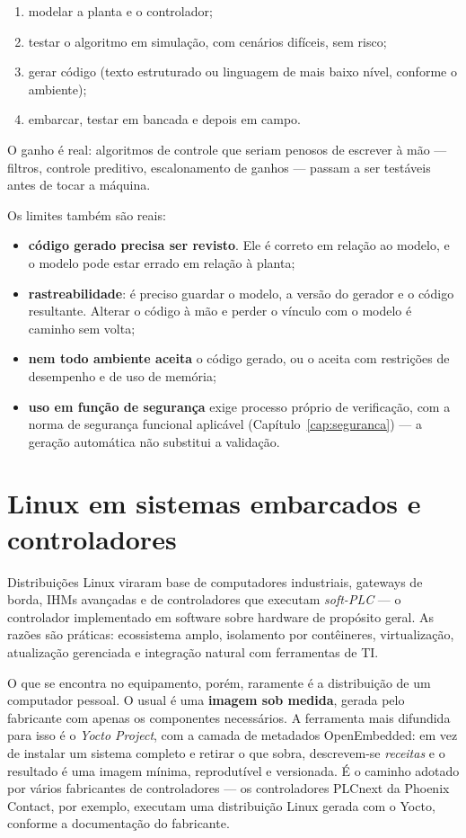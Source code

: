 \begin{enumerate}
  \item modelar a planta e o controlador;
  \item testar o algoritmo em simulação, com cenários difíceis, sem risco;
  \item gerar código (texto estruturado ou linguagem de mais baixo nível, conforme o ambiente);
  \item embarcar, testar em bancada e depois em campo.
\end{enumerate}

O ganho é real: algoritmos de controle que seriam penosos de escrever à mão --- filtros, controle
preditivo, escalonamento de ganhos --- passam a ser testáveis antes de tocar a máquina.

Os limites também são reais:

\begin{itemize}
  \item \textbf{código gerado precisa ser revisto}. Ele é correto em relação ao modelo, e o modelo
        pode estar errado em relação à planta;
  \item \textbf{rastreabilidade}: é preciso guardar o modelo, a versão do gerador e o código
        resultante. Alterar o código à mão e perder o vínculo com o modelo é caminho sem volta;
  \item \textbf{nem todo ambiente aceita} o código gerado, ou o aceita com restrições de desempenho
        e de uso de memória;
  \item \textbf{uso em função de segurança} exige processo próprio de verificação, com a norma de
        segurança funcional aplicável (Capítulo~\ref{cap:seguranca}) --- a geração automática não
        substitui a validação.
\end{itemize}

\section{Linux em sistemas embarcados e controladores}

Distribuições Linux viraram base de computadores industriais, gateways de borda, IHMs avançadas e de
controladores que executam \emph{soft-PLC} --- o controlador implementado em software sobre hardware
de propósito geral. As razões são práticas: ecossistema amplo, isolamento por contêineres,
virtualização, atualização gerenciada e integração natural com ferramentas de TI.

O que se encontra no equipamento, porém, raramente é a distribuição de um computador pessoal. O
usual é uma \textbf{imagem sob medida}, gerada pelo fabricante com apenas os componentes
necessários. A ferramenta mais difundida para isso é o \emph{Yocto Project}, com a
camada de metadados OpenEmbedded: em vez de instalar um sistema completo e retirar o que sobra,
descrevem-se \emph{receitas} e o resultado é uma imagem mínima, reprodutível e versionada. É o
caminho adotado por vários fabricantes de controladores --- os controladores PLCnext da Phoenix
Contact, por exemplo, executam uma distribuição Linux gerada com o Yocto, conforme a documentação do
fabricante.

